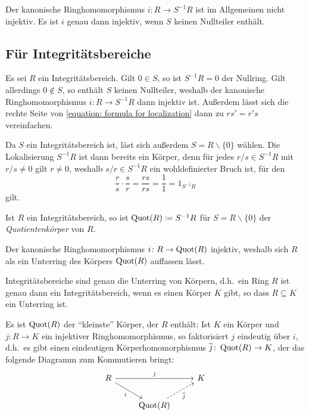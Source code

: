 \begin{warning}
  Der kanonische Ringhomomorphismus $i \colon R \to S^{-1} R$ ist im Allgemeinen nicht injektiv.
  Es ist $i$ genau dann injektiv, wenn $S$ keinen Nullteiler enthält.
\end{warning}



\subsection{Für Integritätsbereiche}

Es sei $R$ ein Integritätsbereich.
Gilt $0 \in S$, so ist $S^{-1} R = 0$ der Nullring.
Gilt allerdings $0 \notin S$, so enthält $S$ keinen Nullteiler, weshalb der kanonische Ringhomomorphismus $i \colon R \to S^{-1} R$ dann injektiv ist.
Außerdem lässt sich die rechte Seite von \eqref{equation: formula for localization} dann zu $rs' = r's$ vereinfachen.

Da $S$ ein Integritätsbereich ist, läst sich außerdem $S = R \smallsetminus \{0\}$ wählen.
Die Lokalisierung $S^{-1} R$ ist dann bereits ein Körper, denn für jedes $r/s \in S^{-1} R$ mit $r/s \neq 0$ gilt $r \neq 0$, weshalb $s/r \in S^{-1} R$ ein wohldefinierter Bruch ist, für den
\[
        \frac{r}{s}
  \cdot \frac{s}{r}
  =     \frac{rs}{rs}
  =     \frac{1}{1}
  =     1_{S^{-1} R}
\]
gilt.

\begin{definition}
  Ist $R$ ein Integritätsbereich, so ist $\operatorname{Quot}(R) \coloneqq S^{-1} R$ für $S = R \smallsetminus \{0\}$ der \emph{Quotientenkörper} von $R$.
\end{definition}

Der kanonische Ringhomomorphismus $i \colon R \to \operatorname{Quot}(R)$ injektiv, weshalb sich $R$ als ein Unterring des Körpers $\operatorname{Quot}(R)$ auffassen lässt.

\begin{corollary}
  Integritätsbereiche sind genau die Unterring von Körpern, d.h.\ ein Ring $R$ ist genau dann ein Integritätsbereich, wenn es einen Körper $K$ gibt, so dass $R \subseteq K$ ein Unterring ist.
\end{corollary}

Es ist $\operatorname{Quot}(R)$ der \enquote{kleinste} Körper, der $R$ enthält:
Ist $K$ ein Körper und $j \colon R \to K$ ein injektiver Ringhomomorphismus, so faktorisiert $j$ eindeutig über $i$, d.h.\ es gibt einen eindeutigen Körperhomomorphismus $\overline{j} \colon \operatorname{Quot}(R) \to K$, der das folgende Diagramm zum Kommutieren bringt:
\[
  \begin{tikzcd}
      R
      \arrow{rr}[above]{j}
      \arrow{dr}[below left]{i}
    & {}
    & K
    \\
      {}
    & \Quot{R}
      \arrow[dashed]{ur}[below right]{\induced{j}}
    & {}
  \end{tikzcd}
\]

